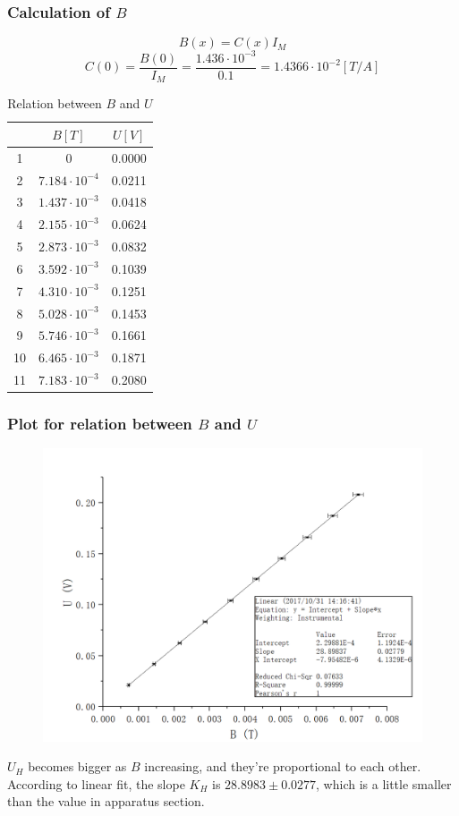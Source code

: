 \documentclass[12pt]{article}
\begin{document}
\subsubsection{Calculation of $B$}
$$B(x)=C(x)I_M$$
$$C(0)=\frac{B(0)}{I_M}=\frac{1.436\cdot10^{-3}}{0.1}=1.4366\cdot10^{-2}[T/A]$$
\begin{table}[H]
\centering
\begin{tabular}{|c|c|c|}
\hline
  &$B[T]$&$U[V]$  \\ \hline
1 &0    &0.0000  \\ \hline
2 &$7.184\cdot10^{-4}$   &0.0211  \\ \hline
3 &$1.437\cdot10^{-3}$  &0.0418  \\ \hline
4 &$2.155\cdot10^{-3}$  &0.0624  \\ \hline
5 &$2.873\cdot10^{-3}$  &0.0832  \\ \hline
6 &$3.592\cdot10^{-3}$  &0.1039  \\ \hline
7 &$4.310\cdot10^{-3}$  &0.1251  \\ \hline
8 &$5.028\cdot10^{-3}$  &0.1453  \\ \hline
9 &$5.746\cdot10^{-3}$  &0.1661  \\ \hline
10&$6.465\cdot10^{-3}$  &0.1871  \\ \hline
11&$7.183\cdot10^{-3}$  &0.2080  \\ \hline
\end{tabular}
\caption{Relation between $B$ and $U$}
\end{table}
\subsubsection{Plot for relation between $B$ and $U$}
\begin{figure}[H]
\centering
\includegraphics[scale=0.4]{P8.jpg}
\end{figure}
$U_H$ becomes bigger as $B$ increasing, and they're proportional to each other.
According to linear fit, the slope $K_H$ is $28.8983\pm0.0277$, which is a little smaller than the value in apparatus section.
\end{document}
